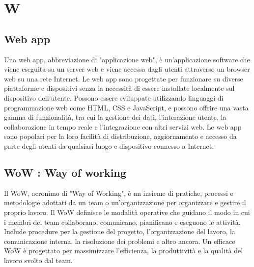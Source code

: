 \section{W}



\vspace{2em}
\subsection*{Web app}
Una web app, abbreviazione di "applicazione web", è un'applicazione software che viene eseguita su un server web e viene accessa dagli utenti attraverso un browser web su una rete Internet. Le web app sono progettate per funzionare su diverse piattaforme e dispositivi senza la necessità di essere installate localmente sul dispositivo dell'utente. Possono essere sviluppate utilizzando linguaggi di programmazione web come HTML, CSS e JavaScript, e possono offrire una vasta gamma di funzionalità, tra cui la gestione dei dati, l'interazione utente, la collaborazione in tempo reale e l'integrazione con altri servizi web. Le web app sono popolari per la loro facilità di distribuzione, aggiornamento e accesso da parte degli utenti da qualsiasi luogo e dispositivo connesso a Internet.

\vspace{2em}
\subsection*{WoW : Way of working}
Il WoW, acronimo di "Way of Working", è un insieme di pratiche, processi e metodologie adottati da un team o un'organizzazione per organizzare e gestire il proprio lavoro. Il WoW definisce le modalità operative che guidano il modo in cui i membri del team collaborano, comunicano, pianificano e eseguono le attività. Include procedure per la gestione del progetto, l'organizzazione del lavoro, la comunicazione interna, la risoluzione dei problemi e altro ancora. Un efficace WoW è progettato per massimizzare l'efficienza, la produttività e la qualità del lavoro svolto dal team.